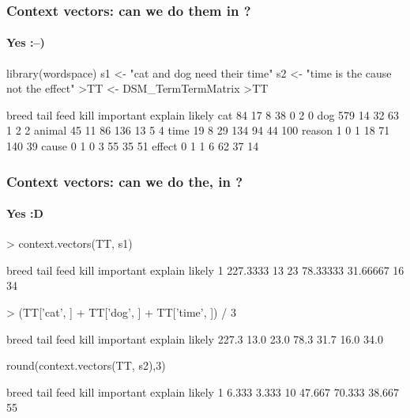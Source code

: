 \documentclass[t]{beamer} %
\begin{document}
\begin{frame}[fragile]
  \frametitle{Context vectors: can we do them in ?}
  \framesubtitle{Yes :--)}
  \ungap[1]
\begin{Rcode}
library(wordspace)
s1 <- "cat and dog need their time" 
s2 <- "time is the cause not the effect"
>TT <- DSM_TermTermMatrix
>TT\begin{Rout}
       breed tail feed kill important explain likely
cat       84   17    8   38         0       2      0
dog      579   14   32   63         1       2      2
animal    45   11   86  136        13       5      4
time      19    8   29  134        94      44    100
reason     1    0    1   18        71     140     39
cause      0    1    0    3        55      35     51
effect     0    1    1    6        62      37     14
\end{Rout}
\end{Rcode}
\end{frame}

\begin{frame}[fragile]
\frametitle{Context vectors: can we do the, in ?}
\framesubtitle{Yes :D}
\begin{Rcode}
> context.vectors(TT, s1)\begin{Rout}
     breed tail feed     kill important explain likely
1 227.3333   13   23 78.33333  31.66667      16     34\end{Rout}
> (TT['cat', ] + TT['dog', ] + TT['time', ]) / 3 \begin{Rout}
breed      tail      feed      kill important   explain    likely 
227.3      13.0      23.0      78.3      31.7      16.0      34.0\end{Rout}
\end{Rcode}
\gap[1]
\begin{Rcode}
round(context.vectors(TT, s2),3)\begin{Rout}
  breed  tail feed   kill important explain likely
1 6.333 3.333   10 47.667    70.333  38.667     55\end{Rout}
\end{Rcode}
\end{frame}
\end{document}
